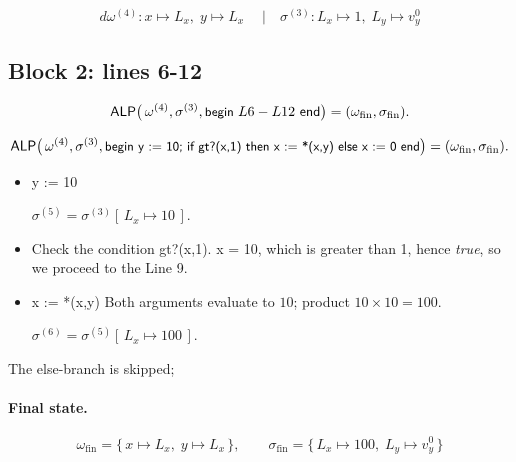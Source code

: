 \documentclass[10pt, a4paper]{article}
\begin{document}
\vspace{-0.4\baselineskip}
\[d
    \omega^{(4)} : x\mapsto L_{x},\; y\mapsto L_{x}
    \quad\;|\quad
    \sigma^{(3)} : L_{x}\mapsto 1,\; L_{y}\mapsto v^{0}_{y}
\]

\subsection*{Block 2: lines 6-12}
\[
  \mathsf{ALP}\bigl(\,\omega^{(4)},\sigma^{(3)},
    \textsf{\small begin } L6 - L12 \textsf{ end}\bigr)
    = (\omega_{\mathrm{fin}},\sigma_{\mathrm{fin}}).
\]

\[
  \mathsf{ALP}\bigl(\,\omega^{(4)},\sigma^{(3)},
    \textsf{\small begin y := 10;
      if gt?(x,1) then x := *(x,y) else x := 0  end}\bigr)
    = (\omega_{\mathrm{fin}},\sigma_{\mathrm{fin}}).
\]

\begin{itemize}
  \item[\bfseries L7.]
        \textsf{y := 10}

        \(
          \sigma^{(5)} = \sigma^{(3)}[\,L_{x}\!\mapsto 10\,].
        \)

  \item[\bfseries L8.]
        Check the condition \textsf{gt?(x,1)}.  
        x = 10, which is greater than 1, hence \emph{true}, so we proceed to the Line 9.
  
  \item[\bfseries L9.] 
        \textsf{x := *(x,y)} 
        Both arguments evaluate to \(10\);  
        product \(10\!\times\!10 = 100\).

        \(
          \sigma^{(6)} = \sigma^{(5)}[\,L_{x}\!\mapsto 100\,].
        \)
\end{itemize}

The \textsf{else}-branch is skipped;  

\paragraph{Final state.}
\[
  \boxed{
    \omega_{\mathrm{fin}}
      = \{\,x\!\mapsto\!L_{x},\; y\!\mapsto\!L_{x}\,\},
    \qquad
    \sigma_{\mathrm{fin}}
      = \{\,L_{x}\!\mapsto\!100,\; L_{y}\!\mapsto\!v^{0}_{y}\,\}
  }
\]
\end{document}
